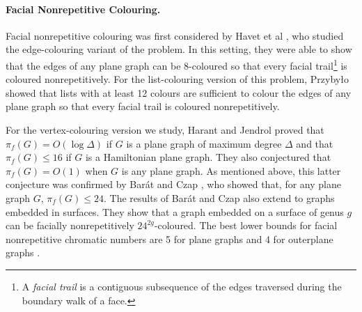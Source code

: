 \documentclass{cccg16}
\begin{document}
\paragraph{Facial Nonrepetitive Colouring.}

Facial nonrepetitive colouring was first considered by Havet et
al \cite{havet2011facial}, who studied the edge-colouring variant
of the problem.  In this setting, they were able to show that
the edges of any plane graph can be 8-coloured so that every facial
trail\footnote{A \emph{facial trail} is a contiguous subsequence of the
edges traversed during the boundary walk of a face.} is coloured
nonrepetitively.  For the list-colouring version of this problem,
Przyby{\l}o \cite{przybylo2013facial} showed that lists with at least
12 colours are sufficient to colour the edges of any plane graph so that
every facial trail is coloured nonrepetitively.

For the vertex-colouring version we study, Harant and Jendrol
\cite{harant2012nonrepetitive} proved that $\pi_f(G)=O(\log\Delta)$ if
$G$ is a plane graph of maximum degree $\Delta$ and that $\pi_f(G)\le
16$ if $G$ is a Hamiltonian plane graph.  They also conjectured that
$\pi_f(G)=O(1)$ when $G$ is any plane graph.  As mentioned above, this
latter conjecture was confirmed by Barát and Czap \cite{barat2013facial},
who showed that, for any plane graph $G$, $\pi_f(G)\le 24$.  The results
of Barát and Czap \cite{barat2013facial} also extend to graphs embedded
in surfaces.  They show that a graph embedded on a surface of genus $g$
can be facially nonrepetitively $24^{2g}$-coloured.  The best lower
bounds for facial nonrepetitive chromatic numbers are 5 for plane graphs
and 4 for outerplane graphs \cite{barat2013facial}.


%
 
\end{document}
